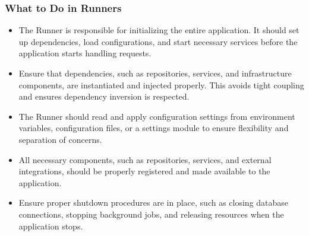 \documentclass[letterpaper,10pt,english]{sphinxhowto}
\begin{document}
\subsubsection{What to Do in Runners}
\label{\detokenize{architecture/runner/index:what-to-do-in-runners}}\begin{itemize}
\item {} \begin{description}
\sphinxAtStartPar
The Runner is responsible for initializing the entire application. It should set up dependencies, load configurations, and start necessary services before the application starts handling requests.

\end{description}

\item {} \begin{description}
\sphinxAtStartPar
Ensure that dependencies, such as repositories, services, and infrastructure components, are instantiated and injected properly. This avoids tight coupling and ensures dependency inversion is respected.

\end{description}

\item {} \begin{description}
\sphinxAtStartPar
The Runner should read and apply configuration settings from environment variables, configuration files, or a settings module to ensure flexibility and separation of concerns.

\end{description}

\item {} \begin{description}
\sphinxAtStartPar
All necessary components, such as repositories, services, and external integrations, should be properly registered and made available to the application.

\end{description}

\item {} \begin{description}
\sphinxAtStartPar
Ensure proper shutdown procedures are in place, such as closing database connections, stopping background jobs, and releasing resources when the application stops.


\end{description}
\end{itemize}
\end{document}
